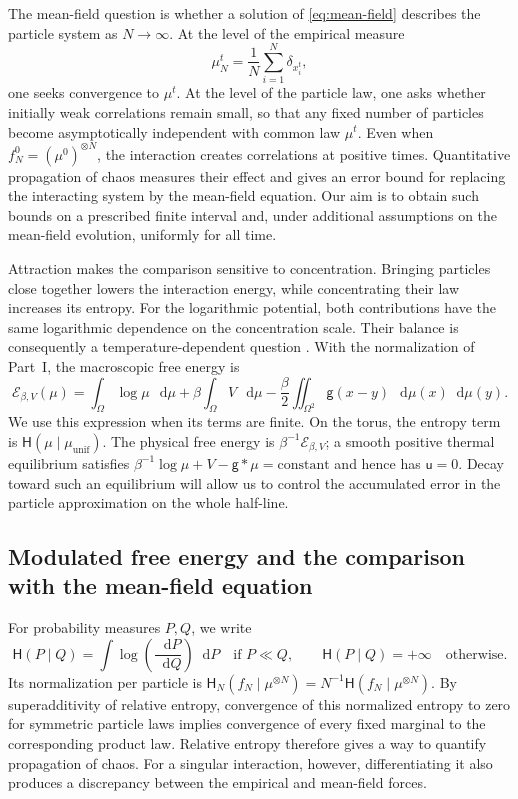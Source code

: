 \documentclass[11pt,reqno]{amsart}
\numberwithin{equation}{section}
\theoremstyle{definition}
\theoremstyle{remark}
\newcommand{\g}{\mathsf g}
\newcommand{\Hr}{\mathsf H}
\newcommand{\Ec}{\mathcal E}
\renewcommand{\u}{\mathsf u}
\newcommand{\muunif}{\mu_{\mathrm{unif}}}
\newcommand{\dd}{\mathop{}\!\mathrm d}
\begin{document}
The mean-field question is whether a solution of \eqref{eq:mean-field} describes the particle system as $N\to\infty$. At the level of the empirical measure
\begin{equation}\label{eq:intro-empirical-measure}
 \mu_N^t=\frac1N\sum_{i=1}^N\delta_{x_i^t},
\end{equation}
one seeks convergence to $\mu^t$. At the level of the particle law, one asks whether initially weak correlations remain small, so that any fixed number of particles become asymptotically independent with common law $\mu^t$. Even when $f_N^0=(\mu^0)^{\otimes N}$, the interaction creates correlations at positive times. Quantitative propagation of chaos measures their effect and gives an error bound for replacing the interacting system by the mean-field equation. Our aim is to obtain such bounds on a prescribed finite interval and, under additional assumptions on the mean-field evolution, uniformly for all time.

Attraction makes the comparison sensitive to concentration. Bringing particles close together lowers the interaction energy, while concentrating their law increases its entropy. For the logarithmic potential, both contributions have the same logarithmic dependence on the concentration scale. Their balance is consequently a temperature-dependent question \cite{CdCRS}. With the normalization of Part~I, the macroscopic free energy is
\begin{equation}\label{eq:intro-macroscopic-free-energy}
 \Ec_{\beta,V}(\mu)
 =\int_\Omega\log\mu\,\dd\mu
  +\beta\int_\Omega V\,\dd\mu
  -\frac\beta2\iint_{\Omega^2}\g(x-y)\,\dd\mu(x)\dd\mu(y).
\end{equation}
We use this expression when its terms are finite. On the torus, the entropy term is $\Hr(\mu\mid\muunif)$. The physical free energy is $\beta^{-1}\Ec_{\beta,V}$; a smooth positive thermal equilibrium satisfies
$\beta^{-1}\log\mu+V-\g*\mu=\mathrm{constant}$ and hence has $\u=0$. Decay toward such an equilibrium will allow us to control the accumulated error in the particle approximation on the whole half-line.

\subsection{Modulated free energy and the comparison with the mean-field equation}
\label{subsec:intro-modulated-free-energy}

For probability measures $P,Q$, we write
\begin{equation}\label{eq:intro-relative-entropy}
 \Hr(P\mid Q)=\int\log\!\left(\frac{\dd P}{\dd Q}\right)\dd P
 \quad\text{if }P\ll Q,
 \qquad
 \Hr(P\mid Q)=+\infty\quad\text{otherwise}.
\end{equation}
Its normalization per particle is
$\Hr_N(f_N\mid\mu^{\otimes N})=N^{-1}\Hr(f_N\mid\mu^{\otimes N})$.
By superadditivity of relative entropy, convergence of this normalized entropy to zero for symmetric particle laws implies convergence of every fixed marginal to the corresponding product law. Relative entropy therefore gives a way to quantify propagation of chaos. For a singular interaction, however, differentiating it also produces a discrepancy between the empirical and mean-field forces.
\end{document}
